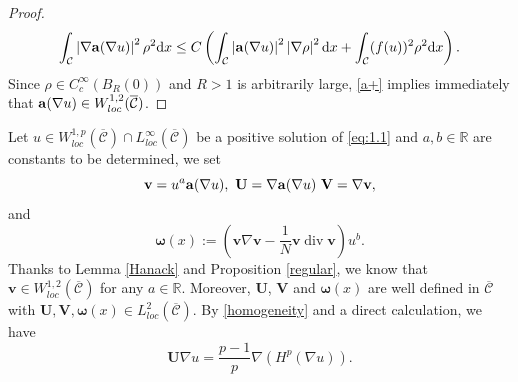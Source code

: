 \documentclass[12pt]{amsart}
\theoremstyle{definition}
\theoremstyle{remark}
\theoremstyle{conclusion}
\theoremstyle{conjecture}
\numberwithin{equation}{section}
\begin{document}
\begin{proof}
\begin{equation}\label{a+}
    \int_{\mathcal{C}}\left\lvert \nabla {\bf{a}}(\nabla u)\right\rvert^2\rho^2\mathrm{d}x\leq
    C\left(\int_{\mathcal{C}}\left\lvert {\bf{a}}(\nabla u)\right\rvert^2\left\lvert\nabla\rho \right\rvert^2 \mathrm{d}x+
    \int_{\mathcal{C}}(f(u))^2\rho^2\mathrm{d}x\right) .
\end{equation}
Since $\rho \in C_c^{\infty}(B_R(0))$ and $R>1$ is arbitrarily large, \eqref{a+} implies immediately that ${\bf{a}}(\nabla u)\in W^{1,2}_{loc}(\overline{\mathcal{C}})$.
\end{proof}

Let $u\in W^{1,p}_{loc}(\overline{\mathcal{C}})\cap L^{\infty}_{loc}(\overline{\mathcal{C}})$ be a positive solution of \eqref{eq:1.1} and $a,b\in\mathbb{R}$ are constants to be determined, we set
\begin{equation}\label{vUV}
 \mathbf{v}=u^a{\bf{a}}(\nabla u),\,\,\mathbf{U}=\nabla {\bf{a}}(\nabla u)\,\,\mathbf{V}=\nabla \mathbf{v},
\end{equation}
and
\begin{equation}\label{omega}
  \bm{\omega}(x):=\left(\mathbf{v}\nabla\mathbf{v}-\frac{1}{N}\mathbf{v}\operatorname{div}\mathbf{v}\right)u^b.
\end{equation}
Thanks to Lemma \ref{Hanack} and Proposition \ref{regular}, we know that $\mathbf{v}\in W^{1,2}_{loc}(\overline{\mathcal{C}})$ for any $a\in\mathbb{R}$. Moreover, $\mathbf{U}$, $\mathbf{V}$ and $\bm{\omega}(x)$ are well defined in $\overline{\mathcal{C}}$ with $\mathbf{U},\mathbf{V},\bm{\omega}(x)\in L^2_{loc}(\overline{\mathcal{C}})$. By \eqref{homogeneity} and a direct calculation, we have
$$\mathbf{U}\nabla u=\frac{p-1}{p}\nabla(H^p(\nabla u)).$$
\end{document}
